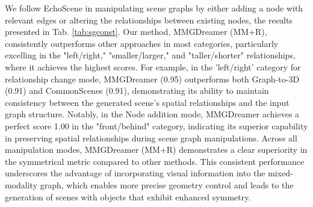 We follow EchoScene \cite{zhai2024echoscene} in manipulating scene graphs by either adding a node with relevant edges or altering the relationships between existing nodes, the results presented in Tab. \ref{tab:sgconst}.
Our method, MMGDreamer (MM+R), consistently outperforms other approaches in most categories, particularly excelling in the "left/right," "smaller/larger," and "taller/shorter" relationships, where it achieves the highest scores. For example, in the 'left/right' category for relationship change mode, MMGDreamer (0.95) outperforms both Graph-to-3D (0.91) and CommonScenes (0.91), demonstrating its ability to maintain consistency between the generated scene's spatial relationships and the input graph structure. Notably, in the Node addition mode, MMGDreamer achieves a perfect score 1.00 in the "front/behind" category, indicating its superior capability in preserving spatial relationships during scene graph manipulations.
Across all manipulation modes, MMGDreamer (MM+R) demonstrates a clear superiority in the symmetrical metric compared to other methods. This consistent performance underscores the advantage of incorporating visual information into the mixed-modality graph, which enables more precise geometry control and leads to the generation of scenes with objects that exhibit enhanced symmetry.


